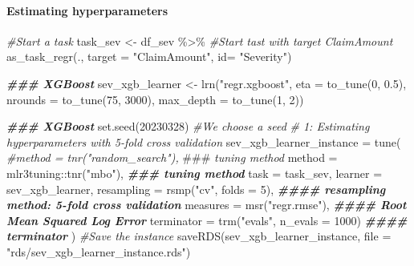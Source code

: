 \documentclass[
]{article}
\newenvironment{Shaded}{\begin{snugshade}}{\end{snugshade}}
\newcommand{\AlertTok}[1]{\textcolor[rgb]{0.94,0.16,0.16}{#1}}
\newcommand{\AttributeTok}[1]{\textcolor[rgb]{0.77,0.63,0.00}{#1}}
\newcommand{\CommentTok}[1]{\textcolor[rgb]{0.56,0.35,0.01}{\textit{#1}}}
\newcommand{\DecValTok}[1]{\textcolor[rgb]{0.00,0.00,0.81}{#1}}
\newcommand{\DocumentationTok}[1]{\textcolor[rgb]{0.56,0.35,0.01}{\textbf{\textit{#1}}}}
\newcommand{\FloatTok}[1]{\textcolor[rgb]{0.00,0.00,0.81}{#1}}
\newcommand{\FunctionTok}[1]{\textcolor[rgb]{0.00,0.00,0.00}{#1}}
\newcommand{\NormalTok}[1]{#1}
\newcommand{\OtherTok}[1]{\textcolor[rgb]{0.56,0.35,0.01}{#1}}
\newcommand{\SpecialCharTok}[1]{\textcolor[rgb]{0.00,0.00,0.00}{#1}}
\newcommand{\StringTok}[1]{\textcolor[rgb]{0.31,0.60,0.02}{#1}}
\begin{document}
\hypertarget{estimating-hyperparameters}{%
\paragraph{Estimating
hyperparameters}\label{estimating-hyperparameters}}

\begin{Shaded}
\begin{Highlighting}[]
\CommentTok{\#Start a task}
\NormalTok{task\_sev }\OtherTok{\textless{}{-}}\NormalTok{ df\_sev }\SpecialCharTok{\%\textgreater{}\%}
  \CommentTok{\#Start tast with target ClaimAmount}
  \FunctionTok{as\_task\_regr}\NormalTok{(.,}
               \AttributeTok{target =} \StringTok{"ClaimAmount"}\NormalTok{,}
               \AttributeTok{id=} \StringTok{"Severity"}\NormalTok{)}

\DocumentationTok{\#\#\# XGBoost}
\NormalTok{sev\_xgb\_learner }\OtherTok{\textless{}{-}} \FunctionTok{lrn}\NormalTok{(}\StringTok{"regr.xgboost"}\NormalTok{,}
                   \AttributeTok{eta =} \FunctionTok{to\_tune}\NormalTok{(}\DecValTok{0}\NormalTok{, }\FloatTok{0.5}\NormalTok{),}
                   \AttributeTok{nrounds =} \FunctionTok{to\_tune}\NormalTok{(}\DecValTok{75}\NormalTok{, }\DecValTok{3000}\NormalTok{),}
                   \AttributeTok{max\_depth =} \FunctionTok{to\_tune}\NormalTok{(}\DecValTok{1}\NormalTok{, }\DecValTok{2}\NormalTok{))}

\DocumentationTok{\#\#\# XGBoost}
\FunctionTok{set.seed}\NormalTok{(}\DecValTok{20230328}\NormalTok{) }\CommentTok{\#We choose a seed}
\CommentTok{\# 1: Estimating hyperparameters with 5{-}fold cross validation}
\NormalTok{sev\_xgb\_learner\_instance }\OtherTok{=} \FunctionTok{tune}\NormalTok{(}
  \CommentTok{\#method = tnr("random\_search"), }\AlertTok{\#\#\#}\CommentTok{ tuning method}
  \AttributeTok{method =}\NormalTok{ mlr3tuning}\SpecialCharTok{::}\FunctionTok{tnr}\NormalTok{(}\StringTok{"mbo"}\NormalTok{), }\DocumentationTok{\#\#\# tuning method}
  \AttributeTok{task =}\NormalTok{ task\_sev,}
  \AttributeTok{learner =}\NormalTok{ sev\_xgb\_learner,}
  \AttributeTok{resampling =} \FunctionTok{rsmp}\NormalTok{(}\StringTok{"cv"}\NormalTok{, }\AttributeTok{folds =} \DecValTok{5}\NormalTok{), }\DocumentationTok{\#\#\#\# resampling method: 5{-}fold cross validation}
  \AttributeTok{measures =} \FunctionTok{msr}\NormalTok{(}\StringTok{"regr.rmse"}\NormalTok{), }\DocumentationTok{\#\#\#\# Root Mean Squared Log Error}
  \AttributeTok{terminator =} \FunctionTok{trm}\NormalTok{(}\StringTok{"evals"}\NormalTok{, }\AttributeTok{n\_evals =} \DecValTok{1000}\NormalTok{) }\DocumentationTok{\#\#\#\# terminator}
\NormalTok{)}
\CommentTok{\#Save the instance}
\FunctionTok{saveRDS}\NormalTok{(sev\_xgb\_learner\_instance, }\AttributeTok{file =} \StringTok{"rds/sev\_xgb\_learner\_instance.rds"}\NormalTok{)}
\end{Highlighting}
\end{Shaded}
\end{document}

